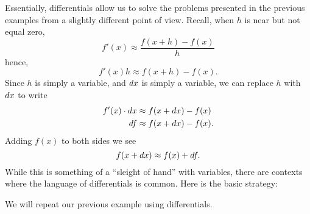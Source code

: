 \documentclass{ximera}
\begin{document}
Essentially, differentials allow us to solve the problems presented in
the previous examples from a slightly different point of view. Recall,
when $h$ is near but not equal zero,
\[
f'(x) \approx \frac{f(x+h)-f(x)}{h}
\]
hence, 
\[
f'(x)h \approx f(x+h)-f(x).
\]
Since $h$ is simply a variable, and $\mathop{}\!d x$ is simply a variable, we can replace $h$ with $\mathop{}\!d x$ to write
\begin{align*}
f'(x)\cdot \mathop{}\!d x &\approx f(x+\mathop{}\!d x)-f(x)\\
\mathop{}\!d f &\approx f(x+\mathop{}\!d x)-f(x).
\end{align*}
Adding $f(x)$ to both sides we see
\[
f(x+\mathop{}\!d x)\approx f(x) + \mathop{}\!d f.
\]
While this is something of a ``sleight of hand'' with variables, there
are contexts where the language of differentials is common. Here is
the basic strategy:
\begin{image}
\end{image}

We will repeat our previous example using differentials.
\end{document}
